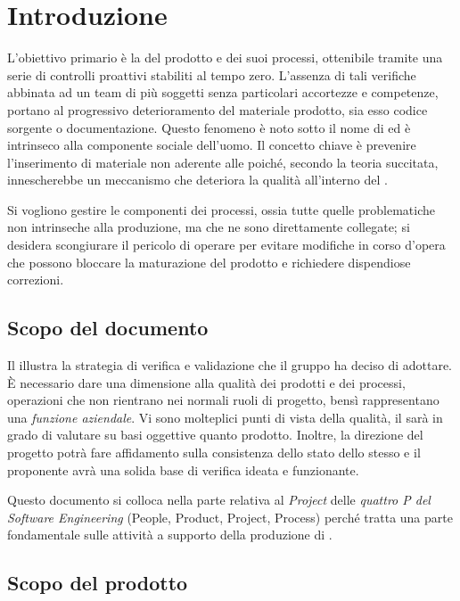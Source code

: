 \section{Introduzione}
 L'obiettivo primario è la  del prodotto e dei suoi processi, ottenibile tramite una serie di controlli proattivi stabiliti al tempo zero. L'assenza di tali verifiche abbinata ad un team di più soggetti senza particolari accortezze e competenze, portano al progressivo deterioramento del materiale prodotto, sia esso codice sorgente o documentazione. Questo fenomeno è noto sotto il nome di  ed è intrinseco alla componente sociale dell'uomo. Il concetto chiave è prevenire l'inserimento di materiale non aderente alle \NormeDiProgetto{} poiché, secondo la teoria succitata, innescherebbe un meccanismo che deteriora la qualità all'interno del .

Si vogliono gestire le componenti  dei processi, ossia tutte quelle problematiche non intrinseche alla produzione, ma che ne sono direttamente collegate; si desidera scongiurare il pericolo di operare  per evitare modifiche in corso d'opera che possono bloccare la  maturazione del prodotto e richiedere dispendiose correzioni.

\subsection{Scopo del documento}
Il \DocTitle{} illustra la strategia di verifica e validazione che il gruppo \GroupName{} ha deciso di adottare. È necessario dare una dimensione alla qualità dei prodotti e dei processi, operazioni che non rientrano nei normali ruoli di progetto, bensì rappresentano una \emph{funzione aziendale}. Vi sono molteplici punti di vista della qualità, il  sarà in grado di valutare su basi oggettive quanto prodotto. Inoltre, la direzione del progetto potrà fare affidamento sulla consistenza dello stato dello stesso e il proponente avrà una solida base di verifica ideata e funzionante.

Questo documento si colloca nella parte relativa al \emph{Project} delle \emph{quattro P del Software Engineering} (People, Product, Project, Process) perché tratta una parte fondamentale sulle attività a supporto della produzione di \ProjectName{}.

\subsection{Scopo del prodotto}
\ScopoDelProdotto 


